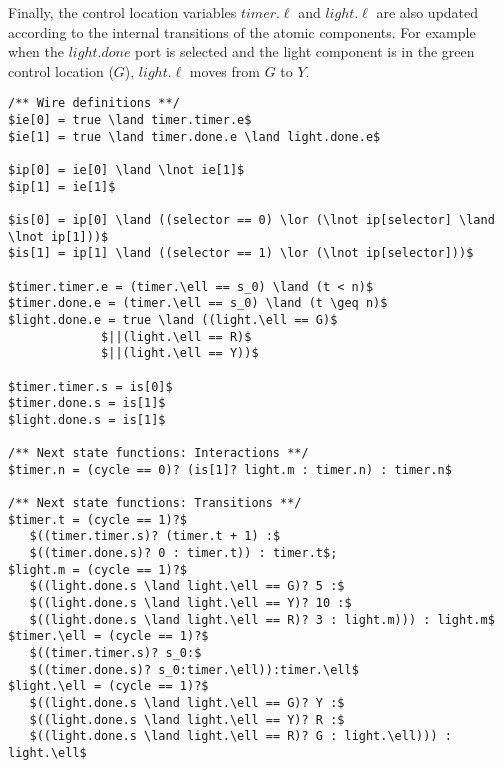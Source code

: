 Finally, the control location variables $timer.\ell$ and 
$light.\ell$ are also updated according to the internal transitions of the 
atomic components. For example when the $light.done$ port is selected
and the light component is in the green control location ($G$), 
 $light.\ell$ moves from $G$ to $Y$. 

\begin{lstlisting}[caption=Sample of \biptool{} generated code,label=sample:code:bip,float=bt]
/** Wire definitions **/
$ie[0] = true \land timer.timer.e$
$ie[1] = true \land timer.done.e \land light.done.e$

$ip[0] = ie[0] \land \lnot ie[1]$
$ip[1] = ie[1]$

$is[0] = ip[0] \land ((selector == 0) \lor (\lnot ip[selector] \land \lnot ip[1]))$
$is[1] = ip[1] \land ((selector == 1) \lor (\lnot ip[selector]))$

$timer.timer.e = (timer.\ell == s_0) \land (t < n)$
$timer.done.e = (timer.\ell == s_0) \land (t \geq n)$
$light.done.e = true \land ((light.\ell == G)$ 
             $||(light.\ell == R)$
             $||(light.\ell == Y))$
             
$timer.timer.s = is[0]$
$timer.done.s = is[1]$
$light.done.s = is[1]$

/** Next state functions: Interactions **/
$timer.n = (cycle == 0)? (is[1]? light.m : timer.n) : timer.n$

/** Next state functions: Transitions **/
$timer.t = (cycle == 1)?$ 
   $((timer.timer.s)? (timer.t + 1) :$
   $((timer.done.s)? 0 : timer.t)) : timer.t$;
$light.m = (cycle == 1)?$
   $((light.done.s \land light.\ell == G)? 5 :$
   $((light.done.s \land light.\ell == Y)? 10 :$
   $((light.done.s \land light.\ell == R)? 3 : light.m))) : light.m$
$timer.\ell = (cycle == 1)?$
   $((timer.timer.s)? s_0:$
   $((timer.done.s)? s_0:timer.\ell)):timer.\ell$
$light.\ell = (cycle == 1)?$
   $((light.done.s \land light.\ell == G)? Y :$
   $((light.done.s \land light.\ell == Y)? R :$
   $((light.done.s \land light.\ell == R)? G : light.\ell))) : light.\ell$
\end{lstlisting}
%
